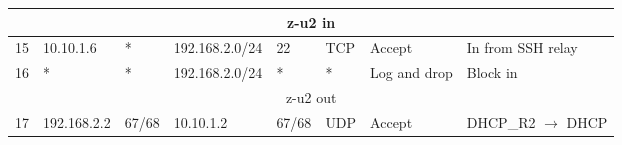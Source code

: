 \documentclass[a4paper, 11pt, oneside]{article}
\begin{document}
\begin{table}[H]
{\begin{tabular}{|llllllll|}
\multicolumn{8}{|c|}{{\color[HTML]{FE0000} z-u2 in}}                                                                                                                                                                                                                                                                                                                                                                                                                                                                                   \\ \hline
\multicolumn{1}{|l|}{15}                        & \multicolumn{1}{l|}{10.10.1.6}                                                    & \multicolumn{1}{l|}{*}                                                              & \multicolumn{1}{l|}{192.168.2.0/24}                                                    & \multicolumn{1}{l|}{22}                                                                  & \multicolumn{1}{l|}{TCP}               & \multicolumn{1}{l|}{Accept}          & In from SSH relay                      \\ \hline
\multicolumn{1}{|l|}{16}                        & \multicolumn{1}{l|}{*}                                                            & \multicolumn{1}{l|}{*}                                                              & \multicolumn{1}{l|}{192.168.2.0/24}                                                    & \multicolumn{1}{l|}{*}                                                                   & \multicolumn{1}{l|}{*}                 & \multicolumn{1}{l|}{Log and drop}    & Block in                               \\ \hline
\multicolumn{8}{|c|}{{\color[HTML]{FE0000} z-u2 out}}                                                                                                                                                                                                                                                                                                                                                                                                                                                                                  \\ \hline
\multicolumn{1}{|l|}{17}                        & \multicolumn{1}{l|}{192.168.2.2}                                                  & \multicolumn{1}{l|}{67/68}                                                          & \multicolumn{1}{l|}{10.10.1.2}                                                         & \multicolumn{1}{l|}{67/68}                                                               & \multicolumn{1}{l|}{UDP}               & \multicolumn{1}{l|}{Accept}          & DHCP\_R2 $\rightarrow$ DHCP            \\ \hline

\end{tabular}}
\end{table}
\end{document}
